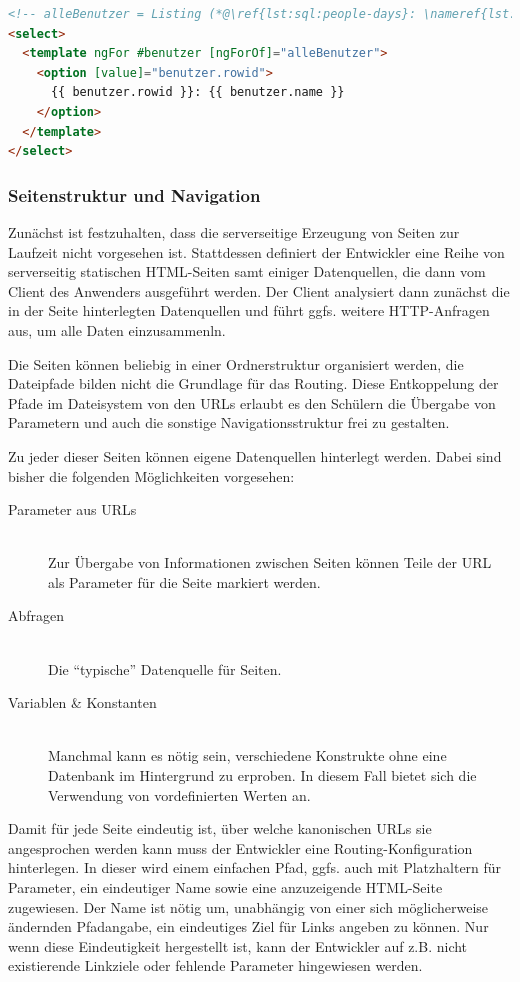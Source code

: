 \begin{lstlisting}[language=HTML, caption=Containerelemente mit Kindern, label=lst:html:select-example]
<!-- alleBenutzer = Listing (*@\ref{lst:sql:people-days}: \nameref{lst:sql:people-days}@*) -->
<select>
  <template ngFor #benutzer [ngForOf]="alleBenutzer">
    <option [value]="benutzer.rowid">
      {{ benutzer.rowid }}: {{ benutzer.name }}
    </option>
  </template>
</select>
\end{lstlisting}

\subsubsection{Seitenstruktur und Navigation}

Zunächst ist festzuhalten, dass die serverseitige Erzeugung von Seiten zur Laufzeit nicht vorgesehen ist. Stattdessen definiert der Entwickler eine Reihe von serverseitig statischen HTML-Seiten samt einiger Datenquellen, die dann vom Client des Anwenders ausgeführt werden. Der Client analysiert dann zunächst die in der Seite hinterlegten Datenquellen und führt ggfs. weitere HTTP-Anfragen aus, um alle Daten einzusammenln.

Die Seiten können beliebig in einer Ordnerstruktur organisiert werden, die Dateipfade bilden nicht die Grundlage für das Routing. Diese Entkoppelung der Pfade im Dateisystem von den URLs erlaubt es den Schülern die Übergabe von Parametern und auch die sonstige Navigationsstruktur frei zu gestalten.

Zu jeder dieser Seiten können eigene Datenquellen hinterlegt werden. Dabei sind bisher die folgenden Möglichkeiten vorgesehen:

\begin{description}
  \item[Parameter aus URLs] \hfill \\
    Zur Übergabe von Informationen zwischen Seiten können Teile der URL als Parameter für die Seite markiert werden.
  \item[Abfragen] \hfill \\
    Die ``typische'' Datenquelle für Seiten.
  \item[Variablen \& Konstanten] \hfill \\
    Manchmal kann es nötig sein, verschiedene Konstrukte ohne eine Datenbank im Hintergrund zu erproben. In diesem Fall bietet sich die Verwendung von vordefinierten Werten an.
\end{description}

Damit für jede Seite eindeutig ist, über welche kanonischen URLs sie angesprochen werden kann muss der Entwickler eine Routing-Konfiguration hinterlegen. In dieser wird einem einfachen Pfad, ggfs. auch mit Platzhaltern für Parameter, ein eindeutiger Name sowie eine anzuzeigende HTML-Seite zugewiesen. Der Name ist nötig um, unabhängig von einer sich möglicherweise ändernden Pfadangabe, ein eindeutiges Ziel für Links angeben zu können. Nur wenn diese Eindeutigkeit hergestellt ist, kann der Entwickler auf z.B. nicht existierende Linkziele oder fehlende Parameter hingewiesen werden.

